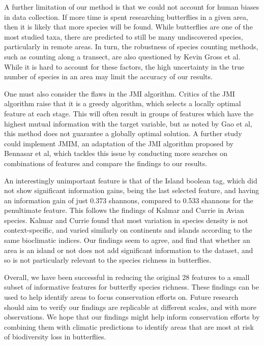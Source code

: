 \documentclass[prl,showpacs,superscriptaddress,twocolumn,longbibliography]{revtex4-1}
\begin{document}
A further limitation of our method is that we could not account for human biases in data collection. If more time is spent researching butterflies in a given area, then it is likely that more species will be found. While butterflies are one of the most studied taxa, there are predicted to still be many undiscovered species, particularly in remote areas. In turn, the robustness of species counting methods, such as counting along a transect, are also questioned by Kevin Gross et al\cite{gross_robustness_2007}. While it is hard to account for these factors, the high uncertainty in the true number of species in an area may limit the accuracy of our results.

One must also consider the flaws in the JMI algorithm. Critics of the JMI algorithm raise that it is a greedy algorithm, which selects a locally optimal feature at each stage. This will often result in groups of features which have the highest mutual information with the target variable, but as noted by Gao et al, this method does not guarantee a globally optimal solution\cite{gao_variational_2016}.  A further study could implement JMIM, an adaptation of the JMI algorithm proposed by Bennasar et al\cite{bennasar_feature_2015}, which tackles this issue by conducting more searches on combinations of features and compare the findings to our results.

An interestingly unimportant feature is that of the Island boolean tag, which did not show significant information gains, being the last selected feature, and having an information gain of just 0.373 shannons, compared to 0.533 shannons for the penultimate feature. This follows the findings of Kalmar and Currie in Avian species\cite{kalmar_unified_2007}. Kalmar and Currie found that most variation in species density is not context-specific, and varied similarly on continents and islands according to the same bioclimatic indices. Our findings seem to agree, and find that whether an area is an island or not does not add significant information to the dataset, and so is not particularly relevant to the species richness in butterflies.

Overall, we have been successful in reducing the original 28 features to a small subset of informative features for butterfly species richness. These findings can be used to help identify areas to focus conservation efforts on. Future research should aim to verify our findings are replicable at different scales, and with more observations. We hope that our findings might help inform conservation efforts by combining them with climatic predictions to identify areas that are most at risk of biodiversity loss in butterflies.
\end{document}
